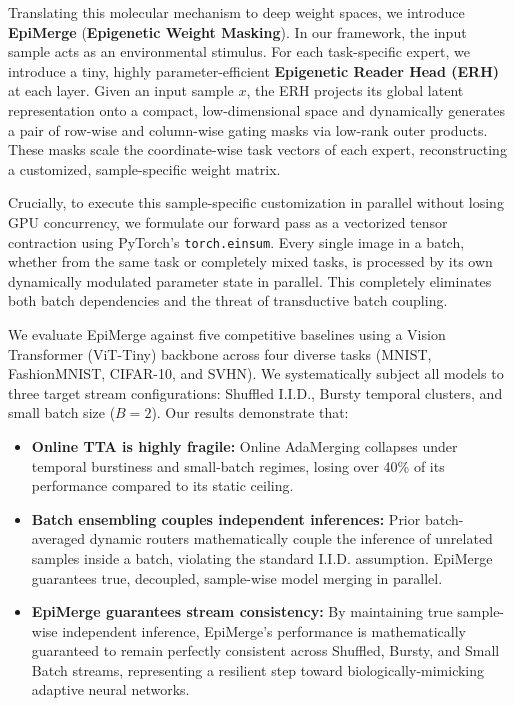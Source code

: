 Translating this molecular mechanism to deep weight spaces, we introduce \textbf{EpiMerge} (\textbf{Epigenetic Weight Masking}). In our framework, the input sample acts as an environmental stimulus. For each task-specific expert, we introduce a tiny, highly parameter-efficient \textbf{Epigenetic Reader Head (ERH)} at each layer. Given an input sample $x$, the ERH projects its global latent representation onto a compact, low-dimensional space and dynamically generates a pair of row-wise and column-wise gating masks via low-rank outer products. These masks scale the coordinate-wise task vectors of each expert, reconstructing a customized, sample-specific weight matrix.

Crucially, to execute this sample-specific customization in parallel without losing GPU concurrency, we formulate our forward pass as a vectorized tensor contraction using PyTorch's \texttt{torch.einsum}. Every single image in a batch, whether from the same task or completely mixed tasks, is processed by its own dynamically modulated parameter state in parallel. This completely eliminates both batch dependencies and the threat of transductive batch coupling.

We evaluate EpiMerge against five competitive baselines using a Vision Transformer (ViT-Tiny) backbone across four diverse tasks (MNIST, FashionMNIST, CIFAR-10, and SVHN). We systematically subject all models to three target stream configurations: Shuffled I.I.D., Bursty temporal clusters, and small batch size ($B=2$). Our results demonstrate that:
\begin{itemize}
    \item \textbf{Online TTA is highly fragile:} Online AdaMerging collapses under temporal burstiness and small-batch regimes, losing over 40\% of its performance compared to its static ceiling.
    \item \textbf{Batch ensembling couples independent inferences:} Prior batch-averaged dynamic routers mathematically couple the inference of unrelated samples inside a batch, violating the standard I.I.D. assumption. EpiMerge guarantees true, decoupled, sample-wise model merging in parallel.
    \item \textbf{EpiMerge guarantees stream consistency:} By maintaining true sample-wise independent inference, EpiMerge's performance is mathematically guaranteed to remain perfectly consistent across Shuffled, Bursty, and Small Batch streams, representing a resilient step toward biologically-mimicking adaptive neural networks.
\end{itemize}


